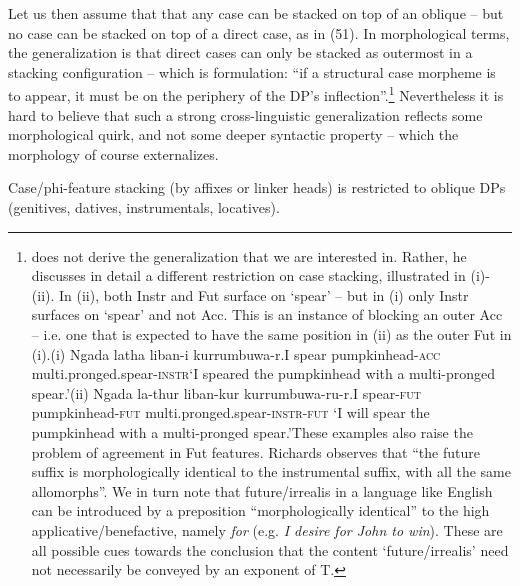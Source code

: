 \documentclass[output=paper]{langsci/langscibook}
\begin{document}
Let us then assume that that any case can be stacked on top of an oblique – but no case can be stacked on top of a direct case, as in (51). In morphological terms, the generalization is that direct cases can only be stacked as outermost in a stacking configuration – which is  formulation: “if a structural case morpheme is to appear, it must be on the periphery of the DP’s inflection”.\footnote{\citet{Richards2013} does not derive the generalization that we are interested in. Rather, he discusses in detail a different restriction on case stacking, illustrated in (i)-(ii). In (ii), both Instr and Fut surface on ‘spear’ – but in (i) only Instr surfaces on ‘spear’ and not Acc. This is an instance of blocking an outer Acc – i.e. one that is expected to have the same position in (ii) as the outer Fut in (i).(i)   Ngada latha   liban-i       kurrumbuwa-r.I   spear   pumpkinhead-\textsc{acc}   multi.pronged.spear-\textsc{instr}‘I speared the pumpkinhead with a multi-pronged spear.’(ii)  Ngada     la-thur     liban-kur     kurrumbuwa-ru-r.I     spear-\textsc{fut}   pumpkinhead-\textsc{fut}   multi.pronged.spear-\textsc{instr-fut} ‘I will spear the pumpkinhead with a multi-pronged spear.’These examples also raise the problem of agreement in Fut features. Richards observes that “the future suffix is morphologically identical to the instrumental suffix, with all the same allomorphs”. We in turn note that future/irrealis in a language like English can be introduced by a preposition “morphologically identical” to the high applicative/benefactive, namely \textit{for} (e.g. \textit{I desire for John to win}). These are all possible cues towards the conclusion that the content ‘future/irrealis’ need not necessarily be conveyed by an exponent of T.}  Nevertheless it is hard to believe that such a strong cross-linguistic generalization reflects some morphological quirk, and not some deeper syntactic property – which the morphology of course externalizes. 

\ea%
    \label{ex:manzini:51}
    Case/phi-feature stacking (by affixes or linker heads) is restricted to oblique DPs (genitives, datives, instrumentals, locatives).  
    \z         
\end{document}
